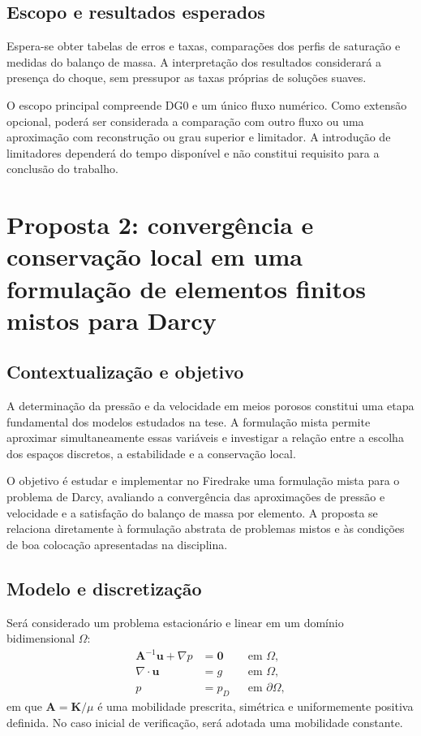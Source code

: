 \documentclass[11pt,a4paper]{article}
\begin{document}
\subsection{Escopo e resultados esperados}

Espera-se obter tabelas de erros e taxas, comparações dos perfis de saturação e medidas do balanço de massa. A interpretação dos resultados considerará a presença do choque, sem pressupor as taxas próprias de soluções suaves.

O escopo principal compreende DG0 e um único fluxo numérico. Como extensão opcional, poderá ser considerada a comparação com outro fluxo ou uma aproximação com reconstrução ou grau superior e limitador. A introdução de limitadores dependerá do tempo disponível e não constitui requisito para a conclusão do trabalho.

\clearpage
\section{Proposta 2: convergência e conservação local em uma formulação de elementos finitos mistos para Darcy}

\subsection{Contextualização e objetivo}

A determinação da pressão e da velocidade em meios porosos constitui uma etapa fundamental dos modelos estudados na tese. A formulação mista permite aproximar simultaneamente essas variáveis e investigar a relação entre a escolha dos espaços discretos, a estabilidade e a conservação local.

O objetivo é estudar e implementar no Firedrake uma formulação mista para o problema de Darcy, avaliando a convergência das aproximações de pressão e velocidade e a satisfação do balanço de massa por elemento. A proposta se relaciona diretamente à formulação abstrata de problemas mistos e às condições de boa colocação apresentadas na disciplina.

\subsection{Modelo e discretização}

Será considerado um problema estacionário e linear em um domínio bidimensional $\Omega$:
\begin{equation}
    \begin{aligned}
        \mathbf{A}^{-1}\mathbf{u}+\nabla p &= \mathbf{0}
        &&\text{em }\Omega,\\
        \nabla\cdot\mathbf{u} &= g
        &&\text{em }\Omega,\\
        p &= p_D
        &&\text{em }\partial\Omega,
    \end{aligned}
\end{equation}
em que $\mathbf{A}=\mathbf{K}/\mu$ é uma mobilidade prescrita, simétrica e uniformemente positiva definida. No caso inicial de verificação, será adotada uma mobilidade constante.
\end{document}
